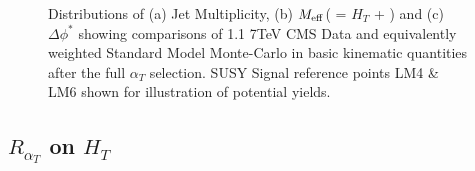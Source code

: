 \begin{figure}[htbp]
    \centering
     \newline

   
\caption{\label{fig:afterat}Distributions of (a) Jet Multiplicity, (b) $M_{\rm eff}$( = $H_{T}$ + \MHT) and (c) $\Delta \phi^{*}$ showing comparisons of 1.1  7TeV CMS Data and equivalently weighted Standard Model Monte-Carlo in basic kinematic quantities after the full $\alpha_{T}$ selection. SUSY Signal reference points LM4 \& LM6 shown for illustration of potential yields.}
\end{figure}

\subsection{$R_{\alpha_{T}}$ on $H_{T}$}

